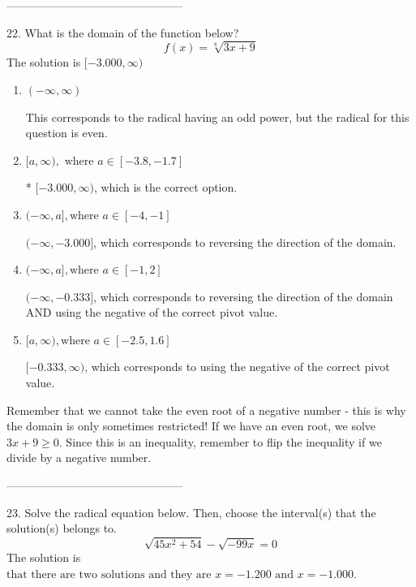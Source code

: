 \documentclass{extbook}[14pt]
\begin{document}
-----------------------------------------------

22. What is the domain of the function below?
\[ f(x) = \sqrt[8]{3 x + 9} \] 
The solution is $ [-3.000, \infty) $ 

\begin{enumerate}[label=\Alph*.] 
\item $ (-\infty, \infty) $ 

 This corresponds to the radical having an odd power, but the radical for this question is even. 
\item $ [a, \infty), \text{ where } a \in [-3.8, -1.7] $ 

 * $[-3.000, \infty)$, which is the correct option. 
\item $ (-\infty, a], \text{where } a \in [-4, -1] $ 

  $(-\infty, -3.000]$, which corresponds to reversing the direction of the domain. 
\item $ (-\infty, a], \text{where } a \in [-1, 2] $ 

 $(-\infty, -0.333]$, which corresponds to reversing the direction of the domain AND using the negative of the correct pivot value. 
\item $ [a, \infty), \text{where } a \in [-2.5, 1.6] $ 

 $[-0.333, \infty)$, which corresponds to using the negative of the correct pivot value. 
\end{enumerate} 
 
Remember that we cannot take the even root of a negative number - this is why the domain is only sometimes restricted! If we have an even root, we solve $3 x + 9 \geq 0$. Since this is an inequality, remember to flip the inequality if we divide by a negative number.

-----------------------------------------------

23. Solve the radical equation below. Then, choose the interval(s) that the solution(s) belongs to.
\[ \sqrt{45 x^2 + 54} - \sqrt{-99 x} = 0 \] 
The solution is $ \text{that there are two solutions and they are } x = -1.200 \text{ and } x = -1.000. $ 
\end{document}
